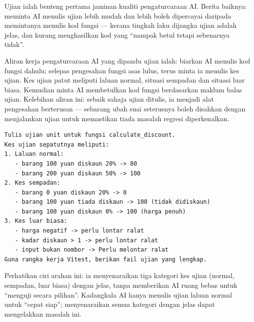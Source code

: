 


Ujian ialah benteng pertama jaminan kualiti pengaturcaraan AI. Berita baiknya: meminta AI menulis ujian lebih mudah dan lebih boleh dipercayai daripada memintanya menulis kod fungsi — kerana tingkah laku dijangka ujian adalah jelas, dan kurang menghasilkan kod yang “nampak betul tetapi sebenarnya tidak”.

Aliran kerja pengaturcaraan AI yang dipandu ujian ialah: biarkan AI menulis kod fungsi dahulu; selepas pengesahan fungsi asas lulus, terus minta ia menulis kes ujian. Kes ujian patut meliputi laluan normal, situasi sempadan dan situasi luar biasa. Kemudian minta AI membetulkan kod fungsi berdasarkan maklum balas ujian. Kelebihan aliran ini: sebaik sahaja ujian ditulis, ia menjadi alat pengesahan berterusan — sebarang ubah suai seterusnya boleh disahkan dengan menjalankan ujian untuk memastikan tiada masalah regresi diperkenalkan.

\begin{lstlisting}
Tulis ujian unit untuk fungsi calculate_discount.
Kes ujian sepatutnya meliputi:
1. Laluan normal:
   - barang 100 yuan diskaun 20% -> 80
   - barang 200 yuan diskaun 50% -> 100
2. Kes sempadan:
   - barang 0 yuan diskaun 20% -> 0
   - barang 100 yuan tiada diskaun -> 100 (tidak didiskaun)
   - barang 100 yuan diskaun 0% -> 100 (harga penuh)
3. Kes luar biasa:
   - harga negatif -> perlu lontar ralat
   - kadar diskaun > 1 -> perlu lontar ralat
   - input bukan nombor -> Perlu melontar ralat
Guna rangka kerja Vitest, berikan fail ujian yang lengkap.
\end{lstlisting}

Perhatikan ciri arahan ini: ia menyenaraikan tiga kategori kes ujian (normal, sempadan, luar biasa) dengan jelas, tanpa memberikan AI ruang bebas untuk “menguji secara pilihan”. Kadangkala AI hanya menulis ujian laluan normal untuk “cepat siap”; menyenaraikan semua kategori dengan jelas dapat mengelakkan masalah ini.

